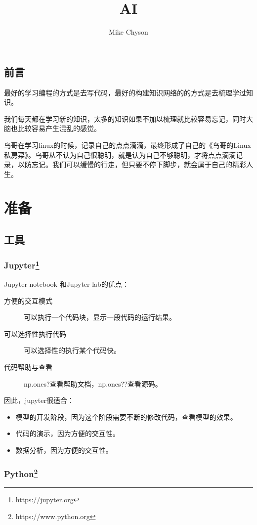\documentclass[a4paper,openright]{book}
\begin{document}
\author{Mike Chyson}
\title{AI}
\maketitle
\tableofcontents{}
\chapter*{前言}

最好的学习编程的方式是去写代码，最好的构建知识网络的的方式是去梳理学过知识。

我们每天都在学习新的知识，太多的知识如果不加以梳理就比较容易忘记，同时大脑也比较容易产生混乱的感觉。

鸟哥在学习linux的时候，记录自己的点点滴滴，最终形成了自己的《鸟哥的Linux私房菜》。鸟哥从不认为自己很聪明，就是认为自己不够聪明，才将点点滴滴记录，以防忘记。我们可以缓慢的行走，但只要不停下脚步，就会属于自己的精彩人生。


\part{准备}
\chapter{工具}
\section{Jupyter\protect\footnote{https://jupyter.org}}

Jupyter notebook 和Jupyter lab的优点：
\begin{description}
\item[方便的交互模式] 可以执行一个代码块，显示一段代码的运行结果。
\item[可以选择性执行代码] 可以选择性的执行某个代码快。
\item[代码帮助与查看] np.ones?查看帮助文档，np.ones??查看源码。
\end{description}



因此，jupyter很适合：
\begin{itemize}
\item 模型的开发阶段，因为这个阶段需要不断的修改代码，查看模型的效果。
\item 代码的演示，因为方便的交互性。
\item 数据分析，因为方便的交互性。
\end{itemize}


\section{Python\protect\footnote{https://www.python.org}}
\end{document}
